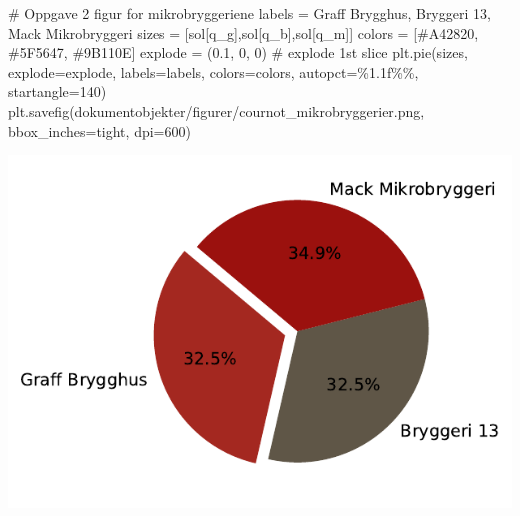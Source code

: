 \documentclass[
  12pt,
  a4paper,
  DIV=11,
  numbers=noendperiod]{scrartcl}
\newenvironment{Shaded}{\begin{snugshade}}{\end{snugshade}}
\newcommand{\CommentTok}[1]{\textcolor[rgb]{0.37,0.37,0.37}{#1}}
\newcommand{\DecValTok}[1]{\textcolor[rgb]{0.68,0.00,0.00}{#1}}
\newcommand{\FloatTok}[1]{\textcolor[rgb]{0.68,0.00,0.00}{#1}}
\newcommand{\NormalTok}[1]{\textcolor[rgb]{0.00,0.23,0.31}{#1}}
\newcommand{\OperatorTok}[1]{\textcolor[rgb]{0.37,0.37,0.37}{#1}}
\newcommand{\SpecialCharTok}[1]{\textcolor[rgb]{0.37,0.37,0.37}{#1}}
\newcommand{\StringTok}[1]{\textcolor[rgb]{0.13,0.47,0.30}{#1}}
\begin{document}
\begin{Shaded}
\begin{Highlighting}[]
\CommentTok{\# Oppgave 2 figur for mikrobryggeriene}
\NormalTok{labels }\OperatorTok{=} \StringTok{\textquotesingle{}Graff Brygghus\textquotesingle{}}\NormalTok{, }\StringTok{\textquotesingle{}Bryggeri 13\textquotesingle{}}\NormalTok{, }\StringTok{\textquotesingle{}Mack Mikrobryggeri\textquotesingle{}}
\NormalTok{sizes }\OperatorTok{=}\NormalTok{ [sol[q\_g],sol[q\_b],sol[q\_m]]}
\NormalTok{colors }\OperatorTok{=}\NormalTok{ [}\StringTok{\textquotesingle{}\#A42820\textquotesingle{}}\NormalTok{, }\StringTok{\textquotesingle{}\#5F5647\textquotesingle{}}\NormalTok{, }\StringTok{\textquotesingle{}\#9B110E\textquotesingle{}}\NormalTok{]}
\NormalTok{explode }\OperatorTok{=}\NormalTok{ (}\FloatTok{0.1}\NormalTok{, }\DecValTok{0}\NormalTok{, }\DecValTok{0}\NormalTok{)  }\CommentTok{\# explode 1st slice}
\NormalTok{plt.pie(sizes, explode}\OperatorTok{=}\NormalTok{explode, labels}\OperatorTok{=}\NormalTok{labels, colors}\OperatorTok{=}\NormalTok{colors, autopct}\OperatorTok{=}\StringTok{\textquotesingle{}}\SpecialCharTok{\%1.1f\%\%}\StringTok{\textquotesingle{}}\NormalTok{, startangle}\OperatorTok{=}\DecValTok{140}\NormalTok{)}
\NormalTok{plt.savefig(}\StringTok{\textquotesingle{}dokumentobjekter/figurer/cournot\_mikrobryggerier.png\textquotesingle{}}\NormalTok{, bbox\_inches}\OperatorTok{=}\StringTok{\textquotesingle{}tight\textquotesingle{}}\NormalTok{, dpi}\OperatorTok{=}\DecValTok{600}\NormalTok{)}
\end{Highlighting}
\end{Shaded}

\includegraphics{Kandidatnummer_30_mappeoppgave_2_SOK_2030_files/figure-pdf/cell-25-output-1.pdf}
\end{document}
